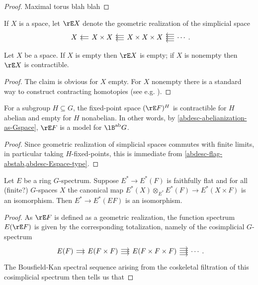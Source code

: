 \begin{proof}
  Maximal torus blah blah
\end{proof}

\begin{notation}
  \label{abdesc-Espace}
  If $X$ is a space, let $\rE X$ denote the geometric realization of
  the simplicial space
  \[
  \simpl{X}{X \times X}{X \times X \times X}.
  \]
\end{notation}

\begin{lemma}
  \label{abdesc-Espace-type}
  Let $X$ be a space. If $X$ is empty then $\rE X$ is empty; if $X$ is
  nonempty then $\rE X$ is contractible.
\end{lemma}

\begin{proof}
  The claim is obvious for $X$ empty. For $X$ nonempty there is a
  standard way to construct contracting homotopies (see
  e.g. \cite[3.14]{dugger-primer}).
\end{proof}

\begin{lemma}
  \label{abdesc-BabG-construction}
  For a subgroup $H \subseteq G$, the fixed-point space $(\rE F)^H$ is
  contractible for $H$ abelian and empty for $H$ nonabelian. In other
  words, by \cref{abdesc-abelianization-as-Gspace}, $\rE F$ is a model
  for $\lB^\ab G$.
\end{lemma}

\begin{proof}
  Since geometric realization of simplicial spaces commutes with
  finite limits, in particular taking $H$-fixed-points, this is
  immediate from \cref{abdesc-flag-abstab,abdesc-Espace-type}.
\end{proof}

\begin{lemma}
  \label{abdesc-flag-faithflat}
  Let $E$ be a ring $G$-spectrum. Suppose $E^* \to E^*(F)$ is
  faithfully flat and for all (finite?) $G$-spaces $X$ the canonical
  map $E^*(X) \otimes_{E^*} E^*(F) \to E^*(X \times F)$ is an
  isomorphism. Then $E^* \to E^*(EF)$ is an isomorphism.
\end{lemma}

\begin{proof}
  As $\rE F$ is defined as a geometric realization, the function
  spectrum $E(\rE F)$ is given by the corresponding totalization,
  namely of the cosimplicial $G$-spectrum
  \[
  \cosimpl{E(F)}{E(F \times F)}{E(F \times F \times F)}.
  \]
  The Bousfield-Kan spectral sequence arising from the coskeletal
  filtration of this cosimplicial spectrum then tells us that 
\end{proof}

